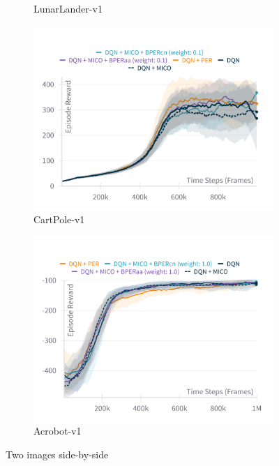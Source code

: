 \begin{figure}[h]
\begin{subfigure}{0.45\textwidth}
        \caption{LunarLander-v1}
        \label{fig:uniform_weighting}
    \end{subfigure}
    \hfill
    \begin{subfigure}{0.45\textwidth}
        \includegraphics[width=\linewidth]{Results/general_results/episode_reward_cartpolev1.png}
        \caption{CartPole-v1}
        \label{fig:uniform_weighting}
    \end{subfigure}
    \hfill
    \begin{subfigure}{0.45\textwidth}
        \includegraphics[width=\linewidth]{Results/general_results/episode_reward_acrobotv1.png}
        \caption{Acrobot-v1}
        \label{fig:uniform_weighting}
    \end{subfigure}
    \caption{Two images side-by-side}
    \label{fig:outdated_priorities}
\end{figure}

